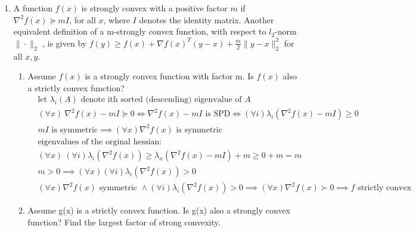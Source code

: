 \documentclass[12pt,letter]{article}
\newcommand{\norm}[1]{\|#1\|}
\begin{document}
\begin{enumerate}
  \pagebreak
\item A function $f(x)$ is strongly convex with a positive factor $m$ if $\nabla^2 f(x) \succeq mI$, for all $x$, where $I$ denotes the identity matrix. Another equivalent definition of a m-strongly convex function, with respect to $l_2$-norm $\norm{\cdot}_2$ , is given by $f (y) \geq f(x)+\nabla f (x)^T (y−x) + \frac{m}{2}\norm{y-x}_2^2$ for all $x, y$.
  \begin{enumerate}
  \item Assume $f(x)$ is a strongly convex function with factor m. Is $f(x)$ also a strictly convex function?
    \begin{align*}
      &\text{let }\lambda_i(A) \text{ denote ith sorted (descending) eigenvalue of }A\\
      &(\forall x)\ \nabla^2 f(x)-mI \succeq 0 \iff \nabla^2 f(x) -mI \text{ is SPD} \iff (\forall i) \lambda_i(\nabla^2 f(x) -mI) \geq 0\\
      &mI \text{ is symmetric} \implies (\forall x) \nabla^2 f(x) \text{ is symmetric}\\
      &\text{eigenvalues of the orginal hessian:}\\
      &(\forall x)\ (\forall i) \lambda_i(\nabla^2 f(x)) \geq \lambda_n(\nabla^2 f(x) -mI) + m \geq  0 + m = m\\
      &m>0 \implies (\forall x) (\forall i) \lambda_i(\nabla^2 f(x)) > 0\\
      &(\forall x) \nabla^2 f(x) \text{ symmetric } \wedge (\forall i) \lambda_i(\nabla^2 f(x)) > 0 \implies (\forall x)\nabla^2 f(x) \succ 0 \implies f \text{ strictly convex}
    \end{align*}
  \item Assume g(x) is a strictly convex function. Is g(x) also a strongly convex function?
    Find the largest factor of strong convexity.


\end{enumerate}
\end{enumerate}
\end{document}

